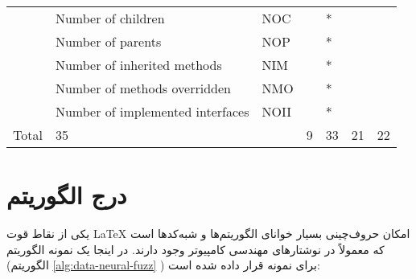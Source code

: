 \begin{table}[]
{\begin{latin}
\begin{tabular}{lllllll}
            & Number of children                               & NOC         &        & *     &      &         \\
            & Number of parents                                & NOP         &        & *     &      &         \\
            & Number of inherited   methods                    & NIM         &        & *     &      &         \\
            & Number of methods   overridden                   & NMO         &        & *     &      &         \\
            & Number of implemented interfaces                 & NOII        &        & *     &      &         \\
            Total       & 35                                               &             & 9      & 33    & 21   & 22      \\ \hline
        \end{tabular}%
        \end{latin}   
 }
\end{table}
 
 
 \section{درج الگوریتم}
 یکی از نقاط قوت 
 \LaTeX
 امکان حروف‌چینی بسیار خوانای الگوریتم‌ها و شبه‌کدها است که معمولاً در نوشتارهای مهندسی کامپیوتر وجود دارند. در اینجا یک نمونه الگوریتم (الگوریتم 
  \ref{alg:data-neural-fuzz}
 ) برای نمونه قرار داده شده است:
 
